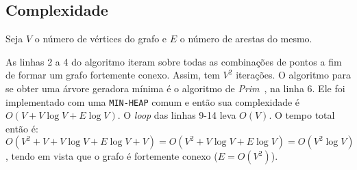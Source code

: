 \documentclass[7pt]{article}
\newcommand{\tit}[1]{\textit{#1}}
\newcommand{\ttt}[1]{\texttt{#1}}
\begin{document}
\begin{multicols}{2}
\section{Complexidade}
Seja $V$ o número de vértices do grafo e $E$ o número de arestas do mesmo.

As linhas 2 a 4 do algoritmo iteram sobre todas as combinações de pontos
a fim de formar um grafo fortemente conexo. Assim, tem $V^2$ iterações.
O algoritmo para se obter uma árvore geradora mínima é o algoritmo de
\tit{Prim}~\cite{clrs}, na linha 6.
Ele foi implementado com uma \ttt{MIN-HEAP} comum e então sua
complexidade é $O(V + V\log{V} + E\log{V})$.
O \tit{loop} das linhas 9-14 leva $O(V)$.
O tempo total então é:
$O(V^2 + V + V\log{V} + E\log{V} + V) = O(V^2 + V\log{V} + E\log{V}) =
O(V^2\log{V})$,
tendo em vista que o grafo é fortemente conexo ($E = O(V^2)$).

\printbibliography

\end{multicols}
\end{document}
